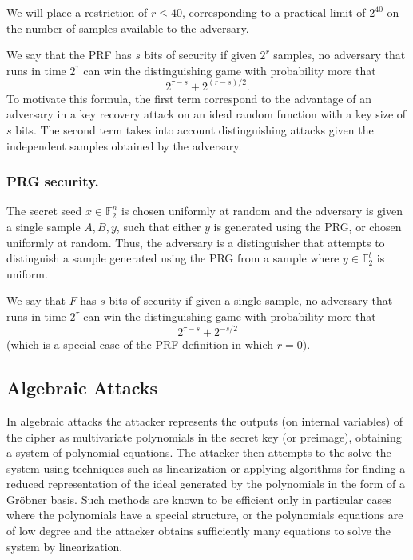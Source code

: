 \documentclass[orivec,envcountsect]{llncs}
\begin{document}
We will place a restriction of $r \leq 40$,
corresponding to a practical limit of $2^{40}$ on the number of samples available to the adversary.

We say that the PRF has $s$ bits of security if given $2^r$ samples, no adversary that runs in time $2^\tau$
can win the distinguishing game with probability more that 
$$2^{\tau - s} + 2^{(r - s)/2}.$$
To motivate this formula, the first term correspond to the advantage of an adversary in a key recovery attack on an ideal random function
with a key size of $s$ bits. The second term takes into account distinguishing attacks given the independent samples obtained by the adversary.


\subsubsection{PRG security.}

The secret seed $x \in \mathbb{F}_2^n$ is chosen uniformly at random
and the adversary is given a single sample $A,B,y$,
such that either $y$ is generated using the PRG, or chosen uniformly at random.
Thus, the adversary is a distinguisher that attempts to distinguish a sample generated using the PRG from
a sample where $y \in \mathbb{F}_2^t$ is uniform.

We say that $F$ has $s$ bits of security if given a single sample, no adversary that runs in time $2^\tau$
can win the distinguishing game with probability more that 
$$2^{\tau - s} + 2^{-s/2}$$
(which is a special case of the PRF definition in which $r=0$).


\subsection{Algebraic Attacks}

In algebraic attacks the attacker represents the outputs (on internal variables) of the cipher as multivariate polynomials in the secret key (or preimage), obtaining a system of polynomial equations. The attacker then attempts to the solve the system using techniques such as linearization or applying algorithms for finding a reduced representation of the ideal generated by the polynomials in the form of a Gr\"{o}bner basis.
Such methods are known to be efficient only in particular cases where the polynomials have a special structure, or the
polynomials equations are of low degree and the attacker obtains sufficiently many equations to solve the system by linearization.
\end{document}
